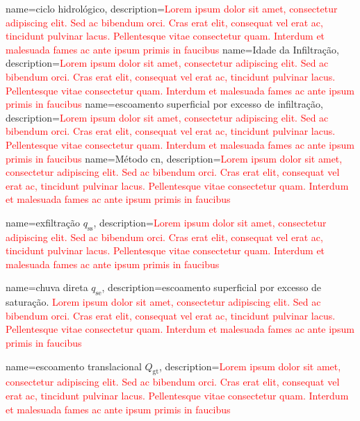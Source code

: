 {
    name=ciclo hidrológico,
    description={\textcolor{red}{Lorem ipsum dolor sit amet, consectetur adipiscing elit. Sed ac bibendum orci. Cras erat elit, consequat vel erat ac, tincidunt pulvinar lacus. Pellentesque vitae consectetur quam. Interdum et malesuada fames ac ante ipsum primis in faucibus}}
}
{
    name=Idade da Infiltração,
    description={\textcolor{red}{Lorem ipsum dolor sit amet, consectetur adipiscing elit. Sed ac bibendum orci. Cras erat elit, consequat vel erat ac, tincidunt pulvinar lacus. Pellentesque vitae consectetur quam. Interdum et malesuada fames ac ante ipsum primis in faucibus}}
}
{
    name=escoamento superficial por excesso de infiltração,
    description={\textcolor{red}{Lorem ipsum dolor sit amet, consectetur adipiscing elit. Sed ac bibendum orci. Cras erat elit, consequat vel erat ac, tincidunt pulvinar lacus. Pellentesque vitae consectetur quam. Interdum et malesuada fames ac ante ipsum primis in faucibus}}
}
{
    name=Método \acrfull{cn},
    description={\textcolor{red}{Lorem ipsum dolor sit amet, consectetur adipiscing elit. Sed ac bibendum orci. Cras erat elit, consequat vel erat ac, tincidunt pulvinar lacus. Pellentesque vitae consectetur quam. Interdum et malesuada fames ac ante ipsum primis in faucibus}}
}

{
    name=exfiltração $q_{\text{ss}}$,
    description={\textcolor{red}{Lorem ipsum dolor sit amet, consectetur adipiscing elit. Sed ac bibendum orci. Cras erat elit, consequat vel erat ac, tincidunt pulvinar lacus. Pellentesque vitae consectetur quam. Interdum et malesuada fames ac ante ipsum primis in faucibus}}
}

{
    name=chuva direta $q_{\text{se}}$,
    description={escoamento superficial por excesso de saturação. \textcolor{red}{Lorem ipsum dolor sit amet, consectetur adipiscing elit. Sed ac bibendum orci. Cras erat elit, consequat vel erat ac, tincidunt pulvinar lacus. Pellentesque vitae consectetur quam. Interdum et malesuada fames ac ante ipsum primis in faucibus}}
}

{
    name=escoamento translacional $Q_{\text{gt}}$,
    description={\textcolor{red}{Lorem ipsum dolor sit amet, consectetur adipiscing elit. Sed ac bibendum orci. Cras erat elit, consequat vel erat ac, tincidunt pulvinar lacus. Pellentesque vitae consectetur quam. Interdum et malesuada fames ac ante ipsum primis in faucibus}}
}

